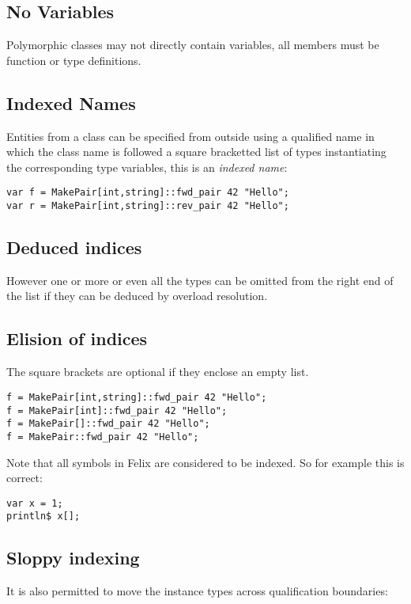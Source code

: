 \documentclass[oneside]{book}
\begin{document}
\subsection{No Variables}
Polymorphic classes may not directly contain variables,
all members must be function or type definitions.

\subsection{Indexed Names}

Entities from a class can be specified from
outside using a qualified name in which the
class name is followed a square bracketted list
of types instantiating the corresponding type
variables, this is an {\em indexed name}:

\begin{verbatim}
var f = MakePair[int,string]::fwd_pair 42 "Hello";
var r = MakePair[int,string]::rev_pair 42 "Hello";
\end{verbatim}

\subsection{Deduced indices}
However one or more or even all the types can be omitted
from the right end of the list if they can be deduced by 
overload resolution. 

\subsection{Elision of indices}
The square brackets are optional if they enclose an
empty list.

\begin{verbatim}
f = MakePair[int,string]::fwd_pair 42 "Hello";
f = MakePair[int]::fwd_pair 42 "Hello";
f = MakePair[]::fwd_pair 42 "Hello";
f = MakePair::fwd_pair 42 "Hello";
\end{verbatim}

Note that all symbols in Felix are considered to be
indexed. So for example this is correct:

\begin{verbatim}
var x = 1;
println$ x[];
\end{verbatim}

\subsection{Sloppy indexing}
It is also permitted to move the instance types across
qualification boundaries:
\end{document}
